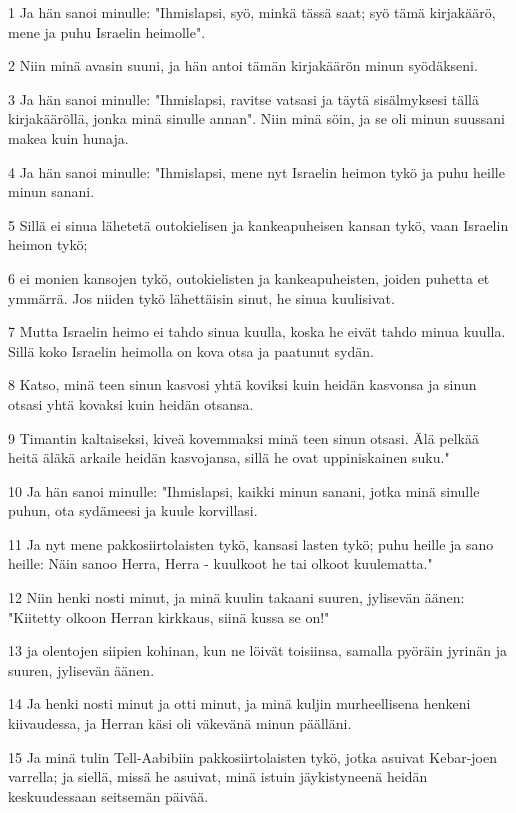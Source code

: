 \par 1 Ja hän sanoi minulle: "Ihmislapsi, syö, minkä tässä saat; syö tämä kirjakäärö, mene ja puhu Israelin heimolle".
\par 2 Niin minä avasin suuni, ja hän antoi tämän kirjakäärön minun syödäkseni.
\par 3 Ja hän sanoi minulle: "Ihmislapsi, ravitse vatsasi ja täytä sisälmyksesi tällä kirjakääröllä, jonka minä sinulle annan". Niin minä söin, ja se oli minun suussani makea kuin hunaja.
\par 4 Ja hän sanoi minulle: "Ihmislapsi, mene nyt Israelin heimon tykö ja puhu heille minun sanani.
\par 5 Sillä ei sinua lähetetä outokielisen ja kankeapuheisen kansan tykö, vaan Israelin heimon tykö;
\par 6 ei monien kansojen tykö, outokielisten ja kankeapuheisten, joiden puhetta et ymmärrä. Jos niiden tykö lähettäisin sinut, he sinua kuulisivat.
\par 7 Mutta Israelin heimo ei tahdo sinua kuulla, koska he eivät tahdo minua kuulla. Sillä koko Israelin heimolla on kova otsa ja paatunut sydän.
\par 8 Katso, minä teen sinun kasvosi yhtä koviksi kuin heidän kasvonsa ja sinun otsasi yhtä kovaksi kuin heidän otsansa.
\par 9 Timantin kaltaiseksi, kiveä kovemmaksi minä teen sinun otsasi. Älä pelkää heitä äläkä arkaile heidän kasvojansa, sillä he ovat uppiniskainen suku."
\par 10 Ja hän sanoi minulle: "Ihmislapsi, kaikki minun sanani, jotka minä sinulle puhun, ota sydämeesi ja kuule korvillasi.
\par 11 Ja nyt mene pakkosiirtolaisten tykö, kansasi lasten tykö; puhu heille ja sano heille: Näin sanoo Herra, Herra - kuulkoot he tai olkoot kuulematta."
\par 12 Niin henki nosti minut, ja minä kuulin takaani suuren, jylisevän äänen: "Kiitetty olkoon Herran kirkkaus, siinä kussa se on!"
\par 13 ja olentojen siipien kohinan, kun ne löivät toisiinsa, samalla pyöräin jyrinän ja suuren, jylisevän äänen.
\par 14 Ja henki nosti minut ja otti minut, ja minä kuljin murheellisena henkeni kiivaudessa, ja Herran käsi oli väkevänä minun päälläni.
\par 15 Ja minä tulin Tell-Aabibiin pakkosiirtolaisten tykö, jotka asuivat Kebar-joen varrella; ja siellä, missä he asuivat, minä istuin jäykistyneenä heidän keskuudessaan seitsemän päivää.
